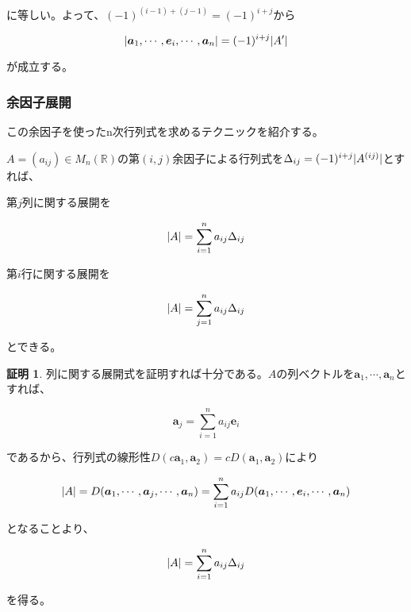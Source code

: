 \documentclass[dvipdfmx,autodetect-engine]{jsarticle}
\theoremstyle{definition}
\newtheorem*{Proof*}{証明}
\DeclarePairedDelimiter{\abs}{\lvert}{\rvert}
\begin{document}
に等しい。よって、$(-1)^{(i-1)+(j-1)} = (-1)^{i+j}$から

$$
\abs{\bm{a}_1, \cdots, \bm{e}_i, \cdots, \bm{a}_n} = (-1)^{i+j}\abs{A'}
$$

が成立する。

\subsubsection{余因子展開}

この余因子を使ったn次行列式を求めるテクニックを紹介する。

$A = (a_{ij}) \in M_n(\mathbb{R})$の第$(i,j)$余因子による行列式を$\Delta_{ij} = (-1)^{i+j}\abs{A^{(ij)}}$とすれば、

第$j$列に関する展開を

$$
\abs{A} = \sum_{i=1}^{n} a_{ij}\Delta_{ij}
$$

第$i$行に関する展開を

$$
\abs{A} = \sum_{j=1}^{n} a_{ij}\Delta_{ij}
$$

とできる。

\begin{Proof*}
列に関する展開式を証明すれば十分である。$A$の列ベクトルを$\bm{a}_1, \cdots, \bm{a}_n$とすれば、

$$
\bm{a}_j = \sum_{i=1}^{n} a_{ij}\bm{e}_i
$$

であるから、行列式の線形性$D(c\bm{a}_1, \bm{a}_2) = cD(\bm{a}_1, \bm{a}_2)$により

$$
\abs{A} = D(\bm{a}_1, \cdots, \bm{a}_j, \cdots, \bm{a}_n) = \sum_{i=1}^{n} a_{ij}D(\bm{a}_1, \cdots, \bm{e}_i, \cdots, \bm{a}_n)
$$

となることより、

$$
\abs{A} = \sum_{i=1}^{n} a_{ij}\Delta_{ij}
$$

を得る。
\end{Proof*}

\end{document}
